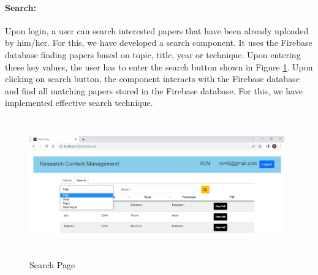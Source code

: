 \paragraph{\textbf{Search:}} Upon login, a user can search interested papers that have been already uploaded by him/her. For this, we have developed a search component. It uses the Firebase database finding papers based on topic, title, year or technique. Upon entering these key values, the user has to enter the search button shown in Figure \ref{fig:search}. Upon clicking on search button, the component interacts with the Firebase database and find all matching papers stored in the Firebase database. For this, we have implemented effective 
search technique.
\begin{figure}[h]
	\centering
	\includegraphics[width=11cm,height=6cm]{./images/search.png}
	\vspace{-0.5cm}
	\caption{Search Page}
	\label{fig:search}
\end{figure}

